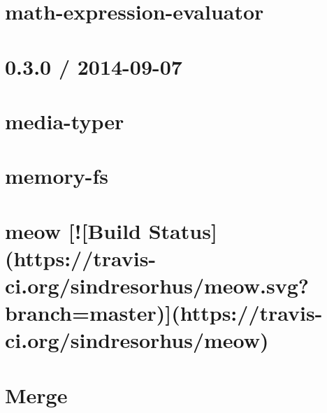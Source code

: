 \documentclass[twoside]{book}
\newcommand{\+}{\discretionary{\mbox{\scriptsize$\hookleftarrow$}}{}{}}
\begin{document}
\chapter{math-\/expression-\/evaluator}
\label{md__c_1_workspace_demo_src_main_script_node_modules_math-expression-evaluator__r_e_a_d_m_e}

\chapter{0.3.0 / 2014-\/09-\/07}
\label{md__c_1_workspace_demo_src_main_script_node_modules_media-typer__h_i_s_t_o_r_y}

\chapter{media-\/typer}
\label{md__c_1_workspace_demo_src_main_script_node_modules_media-typer__r_e_a_d_m_e}

\chapter{memory-\/fs}
\label{md__c_1_workspace_demo_src_main_script_node_modules_memory-fs__r_e_a_d_m_e}

\chapter{meow \mbox{[}!\mbox{[}Build Status\mbox{]}(https\+://travis-\/ci.org/sindresorhus/meow.svg?branch=master)\mbox{]}(https\+://travis-\/ci.org/sindresorhus/meow)}
\label{md__c_1_workspace_demo_src_main_script_node_modules_meow_readme}

\chapter{Merge}
\label{md__c_1_workspace_demo_src_main_script_node_modules_merge__r_e_a_d_m_e}

\end{document}
